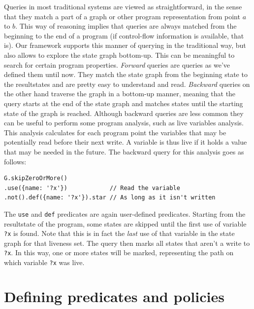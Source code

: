 Queries in most traditional systems are viewed as straightforward, in the sense that they match a part of a graph or other program representation from point $a$ to $b$. This way of reasoning implies that queries are always matched from the beginning to the end of a program (if control-flow information is available, that is). Our framework supports this manner of querying in the traditional way, but also allows to explore the state graph bottom-up. This can be meaningful to search for certain program properties. \textit{Forward} queries are queries as we've defined them until now. They match the state graph from the beginning state to the resultstates and are pretty easy to understand and read. \textit{Backward} queries on the other hand traverse the graph in a bottom-up manner, meaning that the query starts at the end of the state graph and matches states until the starting state of the graph is reached. Although backward queries are less common they can be useful to perform some program analysis, such as live variables analysis. This analysis calculates for each program point the variables that may be potentially read before their next write. A variable is thus live if it holds a value that may be needed in the future. The backward query for this analysis goes as follows:

\begin{lstlisting}[label={lst:Liveness},language=JSQL, caption=Live variables anlysis in JS-QL,mathescape=true]
G.skipZeroOrMore()
.use({name: '?x'})            // Read the variable 
.not().def({name: '?x'}).star // As long as it isn't written
\end{lstlisting}

The \texttt{use} and \texttt{def} predicates are again user-defined predicates. Starting from the resultstate of the program, some states are skipped until the first use of variable \texttt{?x} is found. Note that this is in fact the \textit{last} use of that variable in the state graph for that liveness set. The query then marks all states that aren't a write to \texttt{?x}. In this way, one or more states will be marked, representing the path on which variable \texttt{?x} was live.

\section{Defining predicates and policies}
\label{sec:DefiningPolicies}

